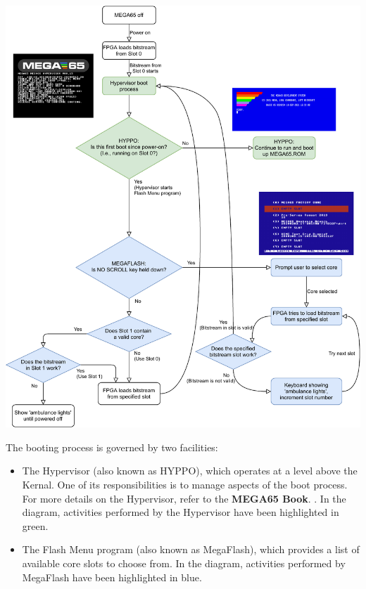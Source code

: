 \includegraphics[width=\linewidth]{images/illustrations/flashmenu-flowchart.pdf}

The booting process is governed by two facilities:
\begin{itemize}
  \item The Hypervisor (also known as HYPPO), which operates at a level above the Kernal. One of its responsibilities is to manage aspects of the boot process. For more details on the Hypervisor, refer to  
\ifdefined\printmanual
the {\bf MEGA65 Book}.
\else
 .
\fi
    In the diagram, activities performed by the Hypervisor have been highlighted in green.
  \item The Flash Menu program (also known as MegaFlash), which provides a list of available core slots to choose from. In the diagram, activities performed by MegaFlash have been highlighted in blue.
\end{itemize}


